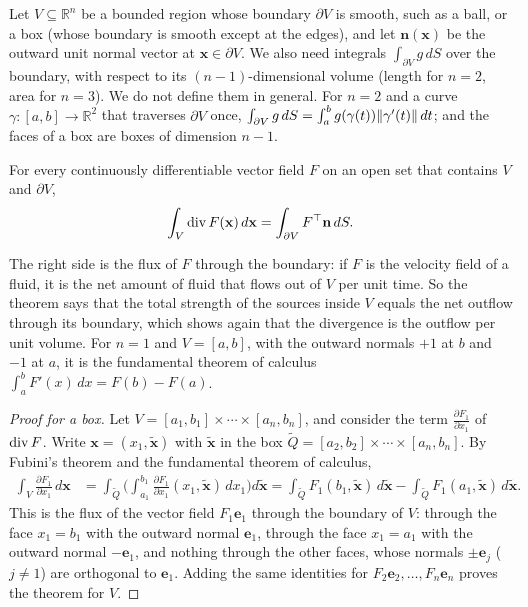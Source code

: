 Let $V \subseteq \mathbb{R}^n$ be a bounded region whose boundary $\partial V$ is smooth, such as a ball, or a box (whose boundary is smooth except at the edges), and let $\mathbf{n}(\mathbf{x})$ be the outward unit normal vector at $\mathbf{x} \in \partial V$. We also need integrals $\int_{\partial V} g\, dS$ over the boundary, with respect to its $(n-1)$-dimensional volume (length for $n = 2$, area for $n = 3$). We do not define them in general. For $n = 2$ and a curve $\gamma: [a, b] \to \mathbb{R}^2$ that traverses $\partial V$ once, $\int_{\partial V} g\, dS = \int_a^b g(\gamma(t))\lVert \gamma'(t) \rVert\, dt$; and the faces of a box are boxes of dimension $n - 1$.

\begin{theorem}\label{L3-thm:divergence}
    For every continuously differentiable vector field $F$ on an open set that contains $V$ and $\partial V$,
    \[\int_V \operatorname{div} F(\mathbf{x})\, d\mathbf{x} = \int_{\partial V} F^\top\mathbf{n}\, dS.\]
\end{theorem}

The right side is the flux of $F$ through the boundary: if $F$ is the velocity field of a fluid, it is the net amount of fluid that flows out of $V$ per unit time. So the theorem says that the total strength of the sources inside $V$ equals the net outflow through its boundary, which shows again that the divergence is the outflow per unit volume. For $n = 1$ and $V = [a, b]$, with the outward normals $+1$ at $b$ and $-1$ at $a$, it is the fundamental theorem of calculus $\int_a^b F'(x)\, dx = F(b) - F(a)$.

\begin{proof}[Proof for a box]
    Let $V = [a_1, b_1] \times \cdots \times [a_n, b_n]$, and consider the term $\frac{\partial F_1}{\partial x_1}$ of $\operatorname{div} F$. Write $\mathbf{x} = (x_1, \tilde{\mathbf{x}})$ with $\tilde{\mathbf{x}}$ in the box $\tilde Q = [a_2, b_2] \times \cdots \times [a_n, b_n]$. By Fubini's theorem and the fundamental theorem of calculus,
    \begin{align*}
        \int_V \frac{\partial F_1}{\partial x_1}\, d\mathbf{x} &= \int_{\tilde Q}\bigg(\int_{a_1}^{b_1}\frac{\partial F_1}{\partial x_1}(x_1, \tilde{\mathbf{x}})\, dx_1\bigg) d\tilde{\mathbf{x}} = \int_{\tilde Q} F_1(b_1, \tilde{\mathbf{x}})\, d\tilde{\mathbf{x}} - \int_{\tilde Q} F_1(a_1, \tilde{\mathbf{x}})\, d\tilde{\mathbf{x}}.
    \end{align*}
    This is the flux of the vector field $F_1\mathbf{e}_1$ through the boundary of $V$: through the face $x_1 = b_1$ with the outward normal $\mathbf{e}_1$, through the face $x_1 = a_1$ with the outward normal $-\mathbf{e}_1$, and nothing through the other faces, whose normals $\pm\mathbf{e}_j$ ($j \neq 1$) are orthogonal to $\mathbf{e}_1$. Adding the same identities for $F_2\mathbf{e}_2, \ldots, F_n\mathbf{e}_n$ proves the theorem for $V$.
\end{proof}

